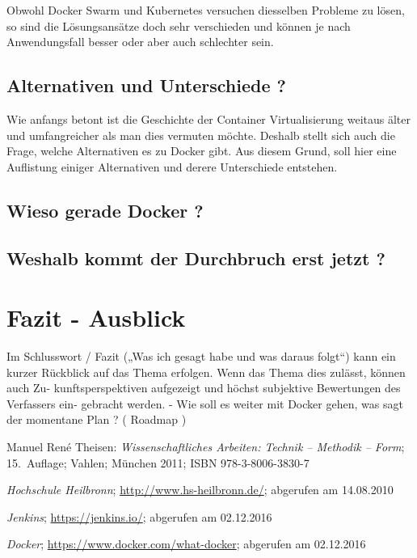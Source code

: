 \documentclass[12pt,toc=bib,toc=listof]{scrreprt}
\begin{document}
Obwohl Docker Swarm und Kubernetes versuchen diesselben Probleme zu lösen, so sind die Lösungsansätze doch sehr verschieden und können je nach Anwendungsfall besser oder aber auch schlechter sein.

\section{Alternativen und Unterschiede ?}
Wie anfangs betont ist die Geschichte der Container Virtualisierung weitaus älter und umfangreicher als man dies vermuten möchte.
Deshalb stellt sich auch die Frage, welche Alternativen es zu Docker gibt.
Aus diesem Grund, soll hier eine Auflistung einiger Alternativen und derere Unterschiede entstehen.






\section{Wieso gerade Docker ?}

\section{Weshalb kommt der Durchbruch erst jetzt ?}

\chapter{Fazit - Ausblick} %
\label{sec:fazit}
Im Schlusswort / Fazit („Was ich gesagt habe und was daraus folgt“) kann ein kurzer
Rückblick auf das Thema erfolgen. Wenn das Thema dies zulässt, können auch Zu-
kunftsperspektiven aufgezeigt und höchst subjektive Bewertungen des Verfassers ein-
gebracht werden.
- Wie soll es weiter mit Docker gehen, was sagt der momentane Plan ? ( Roadmap )


\appendix
\begin{thebibliography}{99}
\raggedright
 Manuel René Theisen:
 \emph{Wissenschaftliches Arbeiten: Technik -- Methodik -- Form};
 15.~Auflage; Vahlen; München 2011;
 ISBN 978-3-8006-3830-7

 \emph{Hochschule Heilbronn};
 \url{http://www.hs-heilbronn.de/};
 abgerufen am 14.08.2010
 
 \emph{Jenkins};
 \url{https://jenkins.io/};
 abgerufen am 02.12.2016
 
 \emph{Docker};
 \url{https://www.docker.com/what-docker};
 abgerufen am 02.12.2016

 
 
 
 
 
 
\end{thebibliography}
\end{document}
